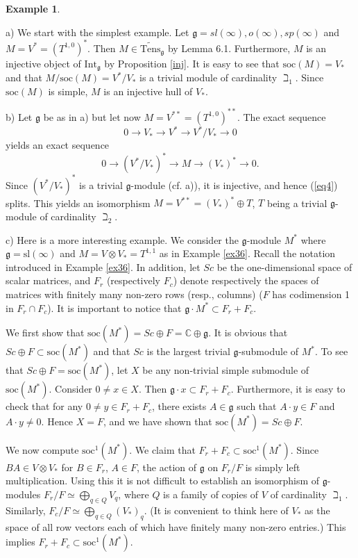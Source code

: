 \documentclass{birkmult}
\newcounter{theorem}
\newtheorem{example}[theo]{Example}
\renewcommand{\gg}{\mathfrak{g}}
\newcommand{\refex}[1]{Example \ref{#1}}
\newcommand{\refeq}[1]{(\ref{#1})}
\renewcommand{\sl}{\mathrm{sl}}
\newcommand{\Int}{\mathrm{Int}}
\newcommand{\lind}{\widetilde{\mathrm{Tens}}}
\newcommand{\soc}{\mathrm{soc}}
\begin{document}
\begin{example}\end{example}

a) We start with the simplest example. Let $\gg=sl(\infty),
o(\infty), sp(\infty)$ and $M=V^*=(T^{1,0})^*$. Then
$M\in\lind_\gg$ by Lemma 6.1. Furthermore, $M$ is an
injective object of $\Int_\gg$ by Proposition \ref{inj}. It is
easy to see that $\soc(M)=V_*$ and that $M/\soc(M)=V^*/V_*$ is a
trivial module of cardinality $\beth_1$. Since $\soc(M)$ is simple, $M$ is
an injective hull of $V_*$.

b) Let $\gg$ be as in a) but let now $M=V^{**}=(T^{1,0})^{**}$. The exact
sequence $$0\to V_*\to V^*\to V^*/V_*\to 0$$ yields an exact
sequence
\begin{equation}\label{eq4}0\to (V^*/V_*)^*\to M\to (V_*)^*\to
0.\end{equation} Since $(V^*/V_*)^*$ is a trivial $\gg$-module
(cf. a)), it is injective, and hence \refeq{eq4} splits. This
yields an isomorphism $M=V^{**}=(V_*)^*\oplus T$, $T$ being a
trivial $\gg$-module of cardinality $\beth_2$.

c) Here is a more interesting example. We consider the
$\gg$-module $M^*$ where $\gg=\sl(\infty)$ and $M=V\otimes
V_*=T^{1,1}$ as in Example \ref{ex36}. Recall the
notation introduced in \refex{ex36}. In addition, let $Sc$ be the
one-dimensional space of scalar matrices, and $F_r$ (respectively
$F_c$) denote respectively the spaces of matrices with finitely
many non-zero rows (resp., columns) ($F$ has codimension 1 in
$F_r\cap F_c$). It is important to notice that $\gg\cdot
M^*\subset F_r+F_c$.

We first show that $\soc (M^*)=Sc\oplus F=\mathbb C\oplus \gg$. It
is obvious that $Sc\oplus F\subset \soc(M^*)$ and that $Sc$ is the largest trivial $\gg$-submodule of $M^*$. To see that
$Sc\oplus F=\soc(M^*)$, let $X$ be any non-trivial simple
submodule of $\soc(M^*)$. Consider
$0\neq x\in X$. Then $\gg\cdot x\subset F_r+F_c$. Furthermore, it
is easy to check that for any $0\neq y\in F_r+F_c$, there exists
$A\in\gg$ such that $A\cdot y\in F$ and  $A\cdot y\neq 0$. Hence $X=F$, and we have shown that $\soc(M^*)=Sc\oplus F$.

We now compute $\soc^1(M^*)$. We claim that
$F_r+F_c\subset\soc^1(M^*)$. Since $BA\in V\otimes V_*$ for $B\in F_r$, $A\in
F$, the action of $\gg$ on $F_r/F$ is simply left multiplication.
Using this it is not difficult to establish an isomorphism of
$\gg$-modules $F_r/F\simeq\bigoplus_{q\in Q}V_q$, where $Q$ is a
family of copies of $V$ of cardinality $\beth_1$. Similarly,
$F_c/F\simeq\bigoplus_{q\in Q}(V_*)_q$. (It is convenient to think
here of $V_*$ as the space of all row vectors each of which have finitely
many non-zero entries.) This implies $F_r+F_c\subset\soc^1 (M^*)$.
\end{document}
